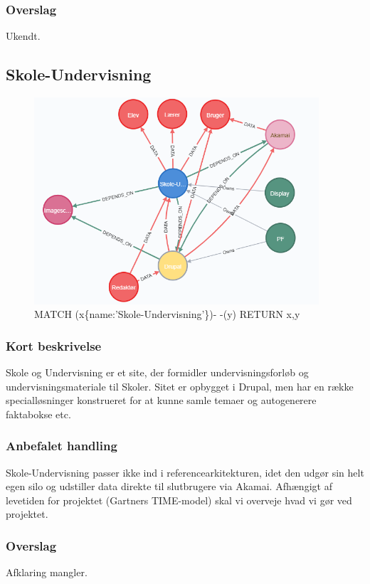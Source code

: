 \documentclass{article}
\begin{document}
\subsubsection{Overslag}
Ukendt.


\subsection{Skole-Undervisning}
\begin{figure}[h]
\includegraphics[width=300pt]{Skole-Undervisning.PNG}
\caption{MATCH (x\{name:'Skole-Undervisning'\})- -(y) RETURN x,y}
\end{figure}
\subsubsection{Kort beskrivelse}
Skole og Undervisning er et site, der formidler undervisningsforløb og undervisningsmateriale til Skoler.  Sitet er opbygget i Drupal, men har en række specialløsninger konstrueret for at kunne samle temaer og autogenerere faktabokse etc. 
\subsubsection{Anbefalet handling}
Skole-Undervisning passer ikke ind i referencearkitekturen, idet den udgør sin helt egen silo og udstiller data direkte til slutbrugere via Akamai. 
Afhængigt af levetiden for projektet (Gartners TIME-model) skal vi overveje hvad vi gør ved projektet.
\subsubsection{Overslag}
Afklaring mangler.
\end{document}
